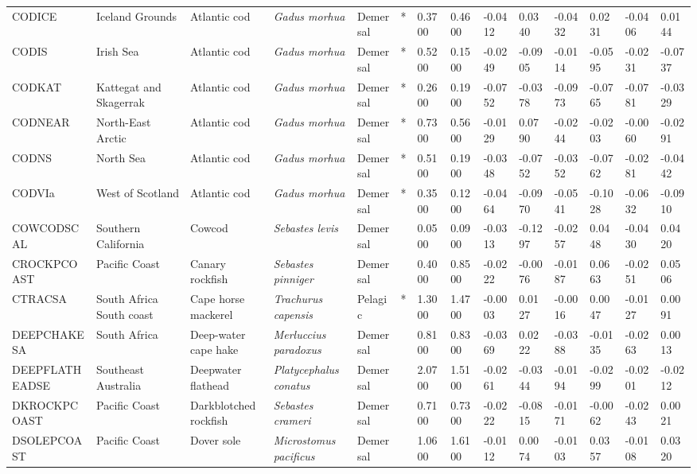 \begin{longtable}{p{2.8cm}p{2cm}p{1.7cm}p{1.7cm}p{1cm}p{0.3cm}p{1cm}p{1cm}p{1cm}p{1cm}p{1cm}p{1cm}p{1cm}p{1cm}}
  CODICE & Iceland Grounds & Atlantic cod & \textit{Gadus morhua} & Demersal & * & 0.3700 & 0.4600 & -0.0412 & 0.0340 & -0.0432 & 0.0231 & -0.0406 & 0.0144 \\ 
  CODIS & Irish Sea & Atlantic cod & \textit{Gadus morhua} & Demersal & * & 0.5200 & 0.1500 & -0.0249 & -0.0905 & -0.0114 & -0.0595 & -0.0231 & -0.0737 \\ 
  CODKAT & Kattegat and Skagerrak & Atlantic cod & \textit{Gadus morhua} & Demersal & * & 0.2600 & 0.1900 & -0.0752 & -0.0378 & -0.0973 & -0.0765 & -0.0781 & -0.0329 \\ 
  CODNEAR & North-East Arctic & Atlantic cod & \textit{Gadus morhua} & Demersal & * & 0.7300 & 0.5600 & -0.0129 & 0.0790 & -0.0244 & -0.0203 & -0.0060 & -0.0291 \\ 
  CODNS & North Sea & Atlantic cod & \textit{Gadus morhua} & Demersal & * & 0.5100 & 0.1900 & -0.0348 & -0.0752 & -0.0352 & -0.0762 & -0.0281 & -0.0442 \\ 
  CODVIa & West of Scotland & Atlantic cod & \textit{Gadus morhua} & Demersal & * & 0.3500 & 0.1200 & -0.0464 & -0.0970 & -0.0541 & -0.1028 & -0.0632 & -0.0910 \\ 
  COWCODSCAL & Southern California & Cowcod & \textit{Sebastes levis} & Demersal &   & 0.0500 & 0.0900 & -0.0313 & -0.1297 & -0.0257 & 0.0448 & -0.0430 & 0.0420 \\ 
  CROCKPCOAST & Pacific Coast & Canary rockfish & \textit{Sebastes pinniger} & Demersal &   & 0.4000 & 0.8500 & -0.0222 & -0.0076 & -0.0187 & 0.0663 & -0.0251 & 0.0506 \\ 
  CTRACSA & South Africa South coast & Cape horse mackerel & \textit{Trachurus capensis} & Pelagic & * & 1.3000 & 1.4700 & -0.0003 & 0.0127 & -0.0016 & 0.0047 & -0.0127 & 0.0091 \\ 
  DEEPCHAKESA & South Africa & Deep-water cape hake & \textit{Merluccius paradoxus} & Demersal &   & 0.8100 & 0.8300 & -0.0369 & 0.0222 & -0.0388 & -0.0135 & -0.0263 & 0.0013 \\ 
  DEEPFLATHEADSE & Southeast Australia & Deepwater flathead & \textit{Platycephalus conatus} & Demersal &   & 2.0700 & 1.5100 & -0.0261 & -0.0344 & -0.0194 & -0.0299 & -0.0201 & -0.0212 \\ 
  DKROCKPCOAST & Pacific Coast & Darkblotched rockfish & \textit{Sebastes crameri} & Demersal &   & 0.7100 & 0.7300 & -0.0222 & -0.0815 & -0.0171 & -0.0062 & -0.0243 & 0.0021 \\ 
  DSOLEPCOAST & Pacific Coast & Dover sole & \textit{Microstomus pacificus} & Demersal &   & 1.0600 & 1.6100 & -0.0112 & 0.0074 & -0.0103 & 0.0357 & -0.0108 & 0.0320 \\ 

\end{longtable}
